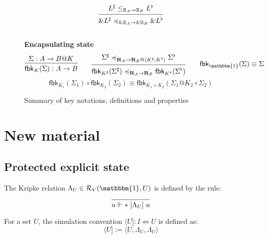 \documentclass[acmsmall,screen,review,anonymous]{acmart}
\newcommand{\kw}[1]{\ensuremath{ \mathsf{#1} }}
\newcommand{\ifr}[1]{\mathrel{[{#1}]}}
\renewcommand{\preceq}{\preccurlyeq}
\newcommand{\caller}[1]{\langle #1 ]}
\begin{document}
\begin{figure}[h]
\[\begin{prooftree}
      \hypo{L^\sharp
        \le_{\mathbb{R}_A \twoheadrightarrow \mathbb{R}_B}
        L^\flat}
      \infer1{\&L^\sharp
        \preceq_{\&\mathbb{R}_A \rightarrow \&\mathbb{R}_B}
        \&L^\flat}
    \end{prooftree}
  \]
  \\[1em]
  \textbf{Encapsulating state}
  \[
    \begin{prooftree}
      \hypo{\Sigma : A \rightarrow B@K}
      \infer1{\kw{fbk}_K(\Sigma) : A \rightarrow B}
    \end{prooftree}
    \qquad
    \begin{prooftree}
      \hypo{\Sigma^\sharp
        \preceq_{\mathbf{R}_A \rightarrow
                 \mathbf{R}_B@\langle K^\sharp,K^\flat \rangle}
        \Sigma^\flat}
      \infer1{\kw{fbk}_{K^\sharp}(\Sigma^\sharp)
        \preceq_{\mathbf{R}_A \rightarrow \mathbf{R}_B}
        \kw{fbk}_{K^\flat}(\Sigma^\flat)}
    \end{prooftree}
    \qquad
    \kw{fbk}_\mathbbm{1}(\Sigma) \equiv \Sigma
  \]
  \vspace{1ex}
  \[
    \kw{fbk}_{K_1}(\Sigma_1) \circ \kw{fbk}_{K_2}(\Sigma_2) \equiv
    \kw{fbk}_{K_1 \times K_2}(\Sigma_1@K_2 \circ \Sigma_2)
  \]
  \caption{Summary of key notations, definitions and properties}
  \label{fig:overview}
\end{figure}

\tableofcontents

\section*{New material} %

\subsection*{Protected explicit state}

The Kripke relation
$\Lambda_U \in \mathcal{R}_V(\mathbbm{1}, U)$
is defined by the rule:
\[
  \begin{prooftree}
    \infer0{u \Vdash * \ifr{\Lambda_U} u}
  \end{prooftree}
\]

\begin{definition}
For a set $U$,
the simulation convention $\caller{U} : I \Leftrightarrow U$
is defined as:
\[
  \caller{U} := \big\langle U,
      \Lambda_U,
      \Lambda_U
    \big\rangle
\]
\end{definition}
\end{document}
